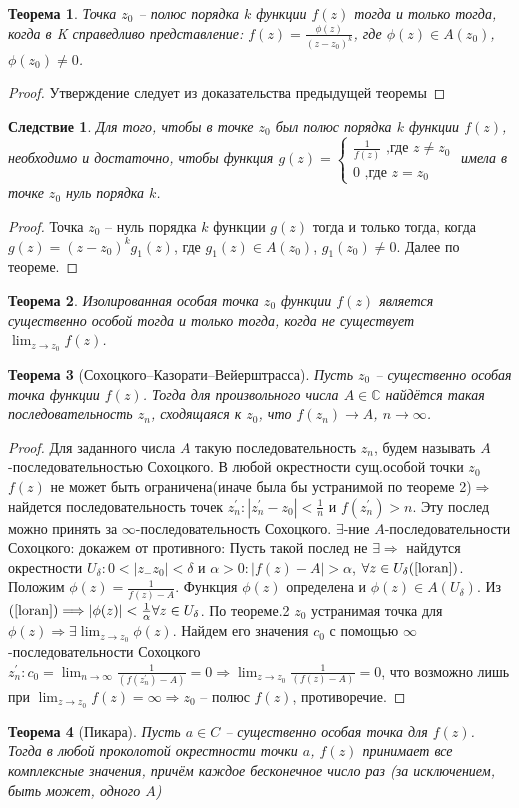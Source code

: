 \documentclass{article}
\newtheorem{theorem}{Теорема}
\newtheorem{sle}{Следствие}
\begin{document}
\begin{theorem}
   Точка $z_0$ – полюс порядка $k$ функции $f(z)$ тогда и только тогда, когда в K справедливо
   представление: $f(z)=\frac{\phi(z)}{(z-z_0)^k}$, где $\phi(z)\in A(z_0)$, $\phi(z_0)\neq 0$.
\end{theorem}
\begin{proof}
    Утверждение следует из доказательства предыдущей теоремы
\end{proof}
\begin{sle}
Для того, чтобы в точке $z_0$ был полюс
порядка $k$ функции $f(z)$, необходимо и достаточно, чтобы функция $g(z)=\begin{cases}
    \frac{1}{f(z)} \text{ ,где } z\neq z_0\\
    0\text{ ,где } z=z_0
   \end{cases}$ имела в точке $z_0$ нуль порядка $k$.
\end{sle}
\begin{proof}
    Точка $z_0$ – нуль порядка $k$ функции $g(z)$ тогда и только тогда, когда $g(z)=(z-z_0)^kg_1(z)$, где $g_1(z) \in A(z_0)$, $g_1(z_0)\neq0$. Далее по теореме.
\end{proof}
\begin{theorem}
   Изолированная особая точка $z_0$ функции
    $f(z)$ является существенно особой тогда и только тогда,
    когда не существует $\displaystyle\lim_{z\rightarrow z_0}f(z)$.
\end{theorem}

\begin{theorem}[Сохоцкого–Казорати–Вейерштрасса]
Пусть $z_0$ – существенно особая точка функции $f(z)$. Тогда
для произвольного числа $A \in \mathbb{C}$ найдётся такая последовательность ${z_n}$, сходящаяся к $z_0$, что $f(z_n)\rightarrow A$, $n \rightarrow \infty$.
\end{theorem}
\begin{proof}
    Для заданного числа $A$ такую последовательность $z_n$, будем называть $A$-последовательностью Сохоцкого. В любой окрестности сущ.особой точки $z_0$ $f(z)$ не может быть ограничена(иначе была бы устранимой по теореме 2)$\Longrightarrow$ найдется последовательность точек $z_n^{'}: |z_n^{'}-z_0|<\frac{1}{n} \text{ и } f(z_n^{'}) > n.$ Эту послед можно принять за $\infty$-последовательность Сохоцкого. $\exists$-ние $A$-последовательности Сохоцкого: докажем от противного: Пусть такой послед не $\exists \Longrightarrow$ найдутся окрестности $U_\delta: 0<|z_-z_0|<\delta$ и $\alpha>0: |f(z)-A|>\alpha$, $\forall z \in U_\delta(\ref{loran})$.
    Положим $\phi(z)=\frac{1}{f(z)-A}$. Функция $\phi(z)$ определена и $\phi(z) \in A(U_\delta)$. Из $(\ref{loran})\Longrightarrow |\phi(z)|<\frac{1}{\alpha} \forall z \in U_\delta$. По теореме.2 $z_0$ устранимая точка для $\phi(z)\Longrightarrow \exists \displaystyle\lim_{z \rightarrow z_0}\phi(z)$. Найдем его значения $c_0$ с помощью $\infty$-последовательности Сохоцкого $z_n^{'}: 
    c_0 = \displaystyle \lim_{n \rightarrow \infty} \frac{1}{(f(z_n^{'})-A)}=0 \Longrightarrow \displaystyle \lim_{z \rightarrow z_0} \frac{1}{(f(z)-A)}=0$, что возможно лишь при $\displaystyle\lim_{z\rightarrow z_0}f(z)=\infty \Longrightarrow z_0$ -- полюс $f(z)$, противоречие. 
\end{proof}

\begin{theorem}[Пикара]
Пусть $a \in C$ – существенно особая точка для $f(z)$. Тогда в любой проколотой окрестности
точки $a$, $f(z)$ принимает все комплексные значения, причём каждое бесконечное число раз
(за исключением, быть может, одного $A$)
\end{theorem}
\end{document}
